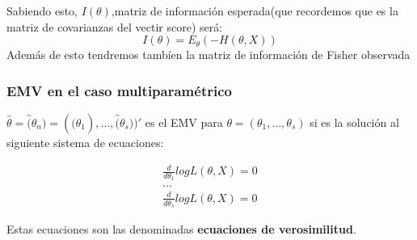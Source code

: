 Sabiendo esto, $I(\theta)$,matriz de información esperada(que recordemos que es la matriz de covarianzas del vectir score) será:
\[
I(\theta) = E_\theta(-H(\theta,X))
\]
Además de esto tendremos tambíen la matriz de información de Fisher observada

\subsubsection{EMV en el caso multiparamétrico}

$\hat{\theta}=\hat(\theta_n)=(\hat(\theta_1),\dots,\hat(\theta_s))'$ es el EMV para $\theta=(\theta_1,\dots,\theta_s)$
si es la solución al siguiente sistema de ecuaciones:

\[
\begin{matrix}
    \frac{d}{d \theta_1} log L(\theta,X)=0 \\
    \dots \\
    \frac{d}{d \theta_s} log L(\theta,X)=0
\end{matrix}
\]

Estas ecuaciones son las denominadas \textbf{ecuaciones de verosimilitud}.

\subsubsection*{}







